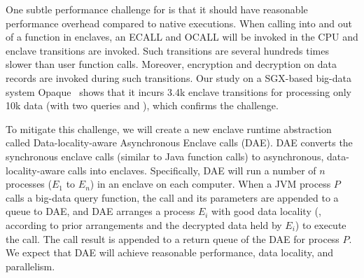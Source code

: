 One subtle performance challenge for \maat is that it should have reasonable 
performance overhead compared to native executions. When calling into and 
out of a function in enclaves, an ECALL and OCALL will be invoked in the CPU 
and enclave transitions are invoked. Such transitions are several hundreds 
times slower than user function calls. Moreover, encryption and decryption on 
data records are invoked during such transitions. Our study on a SGX-based 
big-data system Opaque~\cite{opaque:nsdi17} shows that it incurs 3.4k enclave
transitions for processing only 10k data (with two queries  and 
), which confirms the challenge.





To mitigate this challenge, we will create a new enclave runtime abstraction 
called Data-locality-aware Asynchronous Enclave calls (DAE). DAE converts the 
synchronous enclave calls (similar to Java function calls) to asynchronous, 
data-locality-aware calls into enclaves. Specifically, DAE will run a number of 
$n$ processes ($E_{1}$ to $E_{n}$) in an enclave on each computer. When a 
JVM process $P$ calls a big-data query function, the call and its parameters 
are appended to a queue to DAE, and DAE arranges a process $E_{i}$ with good 
data locality (\eg, according to prior arrangements and the decrypted data 
held by $E_{i}$) to execute the call. The call result is appended to a return 
queue of the DAE for process $P$. We expect that DAE will achieve reasonable 
performance, data locality, and parallelism.

